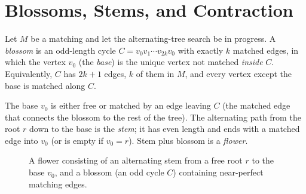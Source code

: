 \section{Blossoms, Stems, and Contraction}

\begin{definition}[Blossom]
\label{ch17:def-blossom}
Let $M$ be a matching and let the alternating-tree search be in progress. A \emph{blossom} is an
odd-length cycle $C=v_0 v_1 \cdots v_{2k} v_0$ with exactly $k$ matched edges, in which the vertex
$v_0$ (the \emph{base}) is the unique vertex not matched \emph{inside} $C$. Equivalently, $C$ has
$2k+1$ edges, $k$ of them in $M$, and every vertex except the base is matched along $C$.
\end{definition}

The base $v_0$ is either free or matched by an edge leaving $C$ (the matched edge that connects the
blossom to the rest of the tree). The alternating path from the root $r$ down to the base is the
\emph{stem}; it has even length and ends with a matched edge into $v_0$ (or is empty if $v_0=r$).
Stem plus blossom is a \emph{flower}.

\begin{figure}[htbp]
\centering
{}
\caption{A flower consisting of an alternating stem from a free root $r$ to the base $v_0$, and a blossom (an odd cycle $C$) containing near-perfect matching edges.}
\label{ch17:fig-blossom-flower}
\end{figure}

